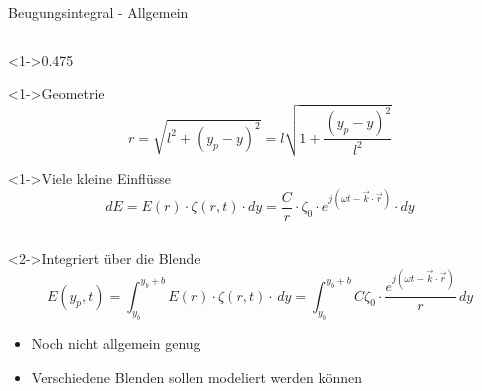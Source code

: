 \begin{frame}{Beugungsintegral - Allgemein}
\begin{columns}
        \begin{column}<1->{0.475\textwidth}
            \begin{block}<1->{Geometrie}
                \begin{equation*}
                    r
                    =
                    \sqrt{l^2 + (y_p-y)^2}
                    =
                    l \sqrt{1 + \frac{(y_p-y)^2}{l^2}}
                \end{equation*}
            \end{block}
            \begin{block}<1->{Viele kleine Einflüsse}
                \begin{equation*}
                    dE
                    =
                    E(r) \cdot \zeta(r, t) \cdot dy
                    =
                    \frac{C}{r} \cdot \zeta_0 \cdot e^{j(\omega t - \vec{k}\cdot\vec{r})} \cdot dy
                \end{equation*}
            \end{block}
        \end{column}
    \end{columns}
    \begin{block}<2->{Integriert über die Blende}
        \begin{equation*}
            E(y_p, t)
            =
            \int_{y_b}^{y_b + b} E(r) \cdot \zeta(r, t) \cdot \,dy
            =
            \int_{y_b}^{y_b+b}C\zeta_0 \cdot \frac{e^{j(\omega t - \vec{k}\cdot\vec{r})}}{r} \,dy
        \end{equation*}
        \vspace*{-0.5\baselineskip}
        \begin{itemize}
            \item<3-> Noch nicht allgemein genug
            \item<4-> Verschiedene Blenden sollen modeliert werden können
        \end{itemize}
    \end{block}
\end{frame}

